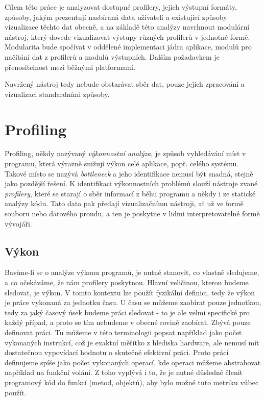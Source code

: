 \documentclass[czech,BP]{thesiskiv}
\begin{document}
Cílem této práce je analyzovat dostupné profilery, jejich výstupní formáty, způsoby, jakým prezentují nasbíraná data uživateli a existující způsoby vizualizace těchto dat obecně, a na základě této analýzy navrhnout modulární nástroj, který dovede vizualizovat výstupy různých profilerů v jednotné formě. Modularita bude spočívat v oddělené implementaci jádra aplikace, modulů pro načítání dat z profilerů a modulů výstupních. Dalším požadavkem je přenositelnost mezi běžnými platformami.

Navržený nástroj tedy nebude obstarávat sběr dat, pouze jejich zpracování a vizualizaci standardními způsoby.

\newpage

\chapter{Profiling}

Profiling, někdy nazývaný \emph{výkonnostní analýza}, je způsob vyhledávání míst v programu, která výrazně snižují výkon celé aplikace, popř. celého systému. Takové místo se nazývá \emph{bottleneck} a jeho identifikace nemusí být snadná, stejně jako pozdější řešení. K identifikaci výkonnostních problémů slouží nástroje zvané \emph{profilery}, které se starají o sběr informací z běhu programu a někdy i ze statické analýzy kódu. Tato data pak předají vizualizačnímu nástroji, ať už ve formě souboru nebo datového proudu, a ten je poskytne v lidmi interpretovatelné formě vývojáři.

\section{Výkon}

Bavíme-li se o analýze výkonu programů, je nutné stanovit, co vlastně sledujeme, a co očekáváme, že nám profilery poskytnou. Hlavní veličinou, kterou budeme sledovat, je výkon. V tomto kontextu lze použít fyzikální definici, tedy že výkon je práce vykonaná za jednotku času. U času se můžeme zaobírat pouze jednotkou, tedy za jaký časový úsek budeme práci sledovat - to je ale velmi specifické pro každý případ, a proto se tím nebudeme v obecné rovině zaobírat. Zbývá pouze definovat práci. Tu můžeme v této terminologii popsat například jako počet vykonaných instrukcí, což je exaktní měřítko z hlediska hardware, ale nemusí mít dostatečnou vypovídací hodnotu o skutečné efektivní práci. Proto práci definujeme spíše jako počet vykonaných operací, kde operaci můžeme abstrahovat například na funkční volání. Z toho vyplývá i to, že je nutné důsledně členit programový kód do funkcí (metod, objektů), aby bylo možné tuto metriku vůbec použít.
\end{document}
